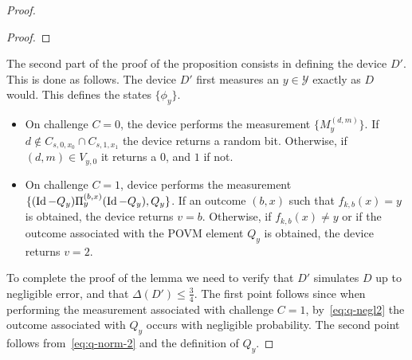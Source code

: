 \documentclass[11pt]{article}
\theoremstyle{remark}
\theoremstyle{definition}
\newcommand{\Tr}{\mbox{\rm Tr}}
\newcommand{\Id}{\ensuremath{\mathop{\rm Id}\nolimits}}
\newcommand{\mY}{\ensuremath{\mathcal{Y}}}
\DeclareMathOperator{\negl}{negl}
\begin{document}
\begin{proof}
\begin{proof}
%
\end{proof}

The second part of the proof of the proposition consists in defining the device $D'$. This is done as follows. The device $D'$ first measures an $y\in\mY$ exactly as $D$ would. This defines the states $\{\phi_y\}$. %
\begin{itemize}
\item On challenge $C=0$, the device performs the measurement $\{M_y^{(d,m)}\}$. If $d\notin C_{s,0,x_0}\cap C_{s,1,x_1}$ the device returns a random bit. Otherwise, if $(d,m)\in V_{y,0}$ it returns a $0$, and $1$ if not. %
\item On challenge $C=1$, device performs the measurement $\{(\Id-Q_y)\Pi_y^{(b,x)}(\Id-Q_y),Q_y\}$. If an outcome $(b,x)$ such that $f_{k,b}(x)=y$ is obtained, the device returns $v=b$. Otherwise, if $f_{k,b}(x)\neq y$ or if the outcome associated with the POVM element $Q_y$ is obtained, the device returns $v=2$. 
\end{itemize}
To complete the proof of the lemma we need to verify that $D'$ simulates $D$ up to negligible error, and that $\Delta(D') \leq \frac{3}{4}$. The first point follows since when performing the measurement associated with challenge $C=1$, by~\eqref{eq:q-negl2} the outcome associated with $Q_y$ occurs with negligible probability. 
The second point follows from~\eqref{eq:q-norm-2} and the definition of $Q_y$.
\end{proof}
\end{document}
